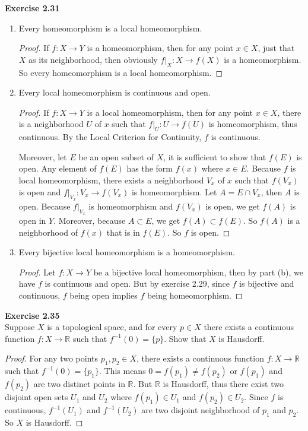 \documentclass[12pt, a4paper]{article}
\theoremstyle{plain}
\newcommand{\R}{\mathbb{R}}
\newenvironment{exercise}[2][Exercise]
    { \begin{mdframed}[backgroundcolor=gray!20] \textbf{#1 #2} \\}
    {  \end{mdframed}}
\begin{document}
\begin{exercise}{2.31}
\begin{enumerate}[label=(\alph*)]
\item Every homeomorphism is a local homeomorphism.
	\begin{proof}
	If $f:X\rightarrow Y$ is a homeomorphism, then for any point $x\in X$, just that $X$ as its neighborhood, then obviously $f\big|_X:X\rightarrow f(X)$ is a homeomorphism. So every homeomorphism is a local homeomorphism.
	\end{proof}

\item Every local homeomorphism is continuous and open.
	\begin{proof}
	If $f:X\rightarrow Y$ is a local homeomorphism, then for any point $x\in X$, there is a neighborhood $U$ of $x$ such that $f\big|_U:U\rightarrow f(U)$ is homeomorphism, thus continuous. By the Local Criterion for Continuity, $f$ is continuous.
	
	Moreover, let $E$ be an open subset of $X$, it is sufficient to show that $f(E)$ is open. Any element of $f(E)$ has the form $f(x)$ where $x\in E$. Because $f$ is local homeomorphism, there exists a neighborhood $V_x$ of $x$ such that $f(V_x)$ is open and $f\big|_{V_x}:V_x\rightarrow f(V_x)$ is homeomorphism. Let $A=E\cap V_x$, then $A$ is open. Because $f\big|_{V_x}$ is homeomorphism and $f(V_x)$ is open, we get $f(A)$ is open in $Y$. Moreover, because $A\subset E$, we get $f(A)\subset f(E)$. So $f(A)$ is a neighborhood of $f(x)$ that is in $f(E)$. So $f$ is open.
	\end{proof}

\item Every bijective local homeomorphism is a homeomorphism.
	\begin{proof}
	Let $f:X\rightarrow Y$ be a bijective local homeomorphism, then by part (b), we have $f$ is continuous and open. But by exercise 2.29, since $f$ is bijective and continuous, $f$ being open implies $f$ being homeomorphism. 
	\end{proof}

\end{enumerate}
\end{exercise}	

\begin{exercise}{2.35}
Suppose $X$ is a topological space, and for every $p\in X$ there exists a continuous function $f:X\rightarrow \R$ such that $f^{-1}(0)=\{p\}$. Show that $X$ is Hausdorff.
\end{exercise}
	\begin{proof}
	For any two points $p_1,p_2\in X$, there exists a continuous function $f:X\rightarrow\R$ such that $f^{-1}(0)=\{p_1\}$. This means $0=f(p_1)\neq f(p_2)$ or $f(p_1)$ and $f(p_2)$ are two distinct points in $\R$. But $\R$ is Hausdorff, thus there exist two disjoint open sets $U_1$ and $U_2$ where $f(p_1)\in U_1$ and $f(p_2)\in U_2$. Since $f$ is continuous, $f^{-1}(U_1)$ and $f^{-1}(U_2)$ are two disjoint neighborhood of $p_1$ and $p_2$. So $X$ is Hausdorff.
	\end{proof}
	
\end{document}
